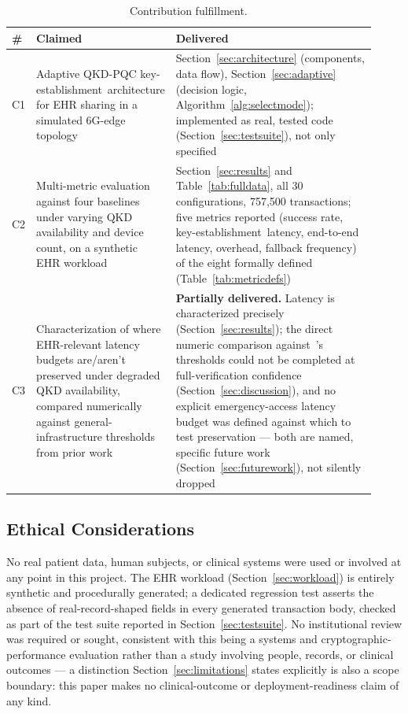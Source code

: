 \documentclass[journal]{IEEEtran}
\newcommand{\keyest}{key-establishment}
\begin{document}
\begin{table}[t]
\centering
\caption{Contribution fulfillment.}
\label{tab:contribfulfillment}
\small
\begin{tabular}{@{}p{0.06\linewidth}p{0.30\linewidth}p{0.56\linewidth}@{}}
\toprule
\# & Claimed & Delivered \\
\midrule
C1 & Adaptive QKD-PQC \keyest\ architecture for EHR sharing in a simulated 6G-edge topology & Section~\ref{sec:architecture} (components, data flow), Section~\ref{sec:adaptive} (decision logic, Algorithm~\ref{alg:selectmode}); implemented as real, tested code (Section~\ref{sec:testsuite}), not only specified \\
C2 & Multi-metric evaluation against four baselines under varying QKD availability and device count, on a synthetic EHR workload & Section~\ref{sec:results} and Table~\ref{tab:fulldata}, all 30 configurations, 757{,}500 transactions; five metrics reported (success rate, \keyest\ latency, end-to-end latency, overhead, fallback frequency) of the eight formally defined (Table~\ref{tab:metricdefs}) \\
C3 & Characterization of where EHR-relevant latency budgets are/aren't preserved under degraded QKD availability, compared numerically against general-infrastructure thresholds from prior work & \textbf{Partially delivered.} Latency is characterized precisely (Section~\ref{sec:results}); the direct numeric comparison against~\cite{zhu2025technoeconomic}'s thresholds could not be completed at full-verification confidence (Section~\ref{sec:discussion}), and no explicit emergency-access latency budget was defined against which to test preservation --- both are named, specific future work (Section~\ref{sec:futurework}), not silently dropped \\
\bottomrule
\end{tabular}
\end{table}

\subsection{Ethical Considerations}

No real patient data, human subjects, or clinical systems were used or involved at any point in this project. The EHR workload (Section~\ref{sec:workload}) is entirely synthetic and procedurally generated; a dedicated regression test asserts the absence of real-record-shaped fields in every generated transaction body, checked as part of the test suite reported in Section~\ref{sec:testsuite}. No institutional review was required or sought, consistent with this being a systems and cryptographic-performance evaluation rather than a study involving people, records, or clinical outcomes --- a distinction Section~\ref{sec:limitations} states explicitly is also a scope boundary: this paper makes no clinical-outcome or deployment-readiness claim of any kind.
\end{document}
